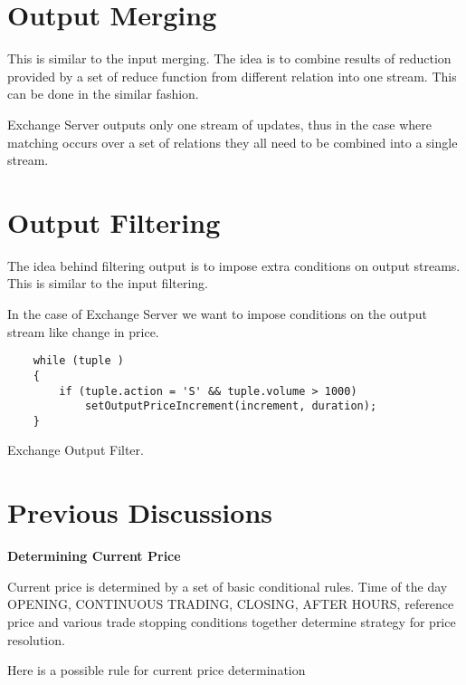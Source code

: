 \documentclass{article}
\begin{document}
\section{Output Merging}

This is similar to the input merging. The idea is to combine results of reduction provided by a set of reduce function from different relation into one stream. This can be done in the similar fashion. 

Exchange Server outputs only one stream of updates, thus in the case where matching occurs over a set of relations they all need to be combined into a single stream. 


\section{Output Filtering} 

The idea behind filtering output is to impose extra conditions on output streams. This is similar to the input filtering. 

In the case of Exchange Server we want to impose conditions on the output stream like change in price. 
\begin{program}
    \begin{verbatim}  
    while (tuple )
    {
        if (tuple.action = 'S' && tuple.volume > 1000)
            setOutputPriceIncrement(increment, duration);
    }
    \end{verbatim}
\caption{Exchange Output Filter.}
\end{program}

\section{Previous Discussions}

{\bf Determining Current Price} 

Current price is determined by a set of basic conditional rules. Time of the day OPENING, CONTINUOUS TRADING, CLOSING, AFTER HOURS, reference price and various trade stopping conditions together determine strategy for price resolution.

Here is a possible rule for current price determination
\end{document}
